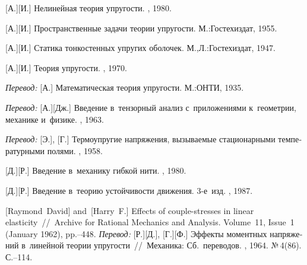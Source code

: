 \begin{thebibliography}{123}
\begin{otherlanguage}{russian}
[А.][И.] Нелинейная теория упругости. \naukapublisher, 1980. 

[А.][И.] Пространственные задачи теории упругости. М.:\;Гос\-тех\-издат, 1955. 

[А.][И.] Статика тонкостенных упругих оболочек. М.,\:Л.:\;Гос\-тех\-издат, 1947. 

[А.][И.] Теория упругости. \naukapublisher, 1970. 

\emph{Перевод:} [А.] Математическая теория упругости. М.:\;ОНТИ, 1935. 

\emph{Перевод:} [А.][Дж.] Введение в~тензорный анализ с~приложениями к~геометрии, механике и~физике. \fizmatgiz, 1963. 

\emph{Перевод:} [Э.], [Г.] Термоупругие напряжения, вызываемые стационарными температурными полями. \fizmatgiz, 1958. 

[Д.][Р.] Введение в~механику гибкой нити. \naukapublisher, 1980. 

[Д.][Р.] Введение в~теорию устойчивости движения. 3\hbox{-}е~изд. \naukapublisher, 1987. 

[Raymond~David] %
and~[Harry~F.] %
Effects of couple-stresses in linear elasticity~//~Archive for Rational Mechanics and Analysis. Volume~11, Issue~1 (January 1962), pp.\hbox{--}448.
\emph{Перевод:}
[Р.][Д.], [Г.][Ф.]
Эффекты моментных напряжений в~линейной теории упругости~//~Механика: Сб.~переводов. \mirpublisher, 1964. №\,4\:(86). С.\hbox{--}114.


\end{otherlanguage}
\end{thebibliography}
